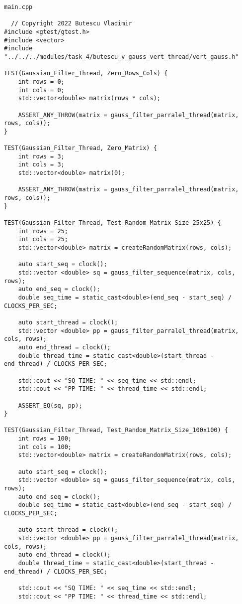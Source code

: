 \documentclass{report}
\begin{document}
\begin{lstlisting}
main.cpp

  // Copyright 2022 Butescu Vladimir
#include <gtest/gtest.h>
#include <vector>
#include "../../../modules/task_4/butescu_v_gauss_vert_thread/vert_gauss.h"

TEST(Gaussian_Filter_Thread, Zero_Rows_Cols) {
    int rows = 0;
    int cols = 0;
    std::vector<double> matrix(rows * cols);

    ASSERT_ANY_THROW(matrix = gauss_filter_parralel_thread(matrix, rows, cols));
}

TEST(Gaussian_Filter_Thread, Zero_Matrix) {
    int rows = 3;
    int cols = 3;
    std::vector<double> matrix(0);

    ASSERT_ANY_THROW(matrix = gauss_filter_parralel_thread(matrix, rows, cols));
}

TEST(Gaussian_Filter_Thread, Test_Random_Matrix_Size_25x25) {
    int rows = 25;
    int cols = 25;
    std::vector<double> matrix = createRandomMatrix(rows, cols);

    auto start_seq = clock();
    std::vector <double> sq = gauss_filter_sequence(matrix, cols, rows);
    auto end_seq = clock();
    double seq_time = static_cast<double>(end_seq - start_seq) / CLOCKS_PER_SEC;

    auto start_thread = clock();
    std::vector <double> pp = gauss_filter_parralel_thread(matrix, cols, rows);
    auto end_thread = clock();
    double thread_time = static_cast<double>(start_thread - end_thread) / CLOCKS_PER_SEC;

    std::cout << "SQ TIME: " << seq_time << std::endl;
    std::cout << "PP TIME: " << thread_time << std::endl;

    ASSERT_EQ(sq, pp);
}

TEST(Gaussian_Filter_Thread, Test_Random_Matrix_Size_100x100) {
    int rows = 100;
    int cols = 100;
    std::vector<double> matrix = createRandomMatrix(rows, cols);

    auto start_seq = clock();
    std::vector <double> sq = gauss_filter_sequence(matrix, cols, rows);
    auto end_seq = clock();
    double seq_time = static_cast<double>(end_seq - start_seq) / CLOCKS_PER_SEC;

    auto start_thread = clock();
    std::vector <double> pp = gauss_filter_parralel_thread(matrix, cols, rows);
    auto end_thread = clock();
    double thread_time = static_cast<double>(start_thread - end_thread) / CLOCKS_PER_SEC;

    std::cout << "SQ TIME: " << seq_time << std::endl;
    std::cout << "PP TIME: " << thread_time << std::endl;


\end{lstlisting}
\end{document}
